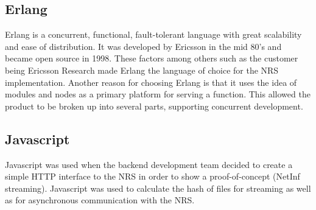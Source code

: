 \subsection{Erlang}
Erlang is a concurrent, functional, fault-tolerant language with great scalability and ease of distribution. It was developed by Ericsson in the mid 80's and became open source in 1998.\cite{otpInAction} These factors among others such as the customer being Ericsson Research made Erlang the language of choice for the NRS implementation.
Another reason for choosing Erlang is that it uses the idea of modules and nodes as a primary platform for serving a function. This allowed the product to be broken up into several parts, supporting concurrent development.
\subsection{Javascript}
Javascript \cite{javascript} was used when the backend development team decided to create a simple HTTP interface to the NRS in order to show a proof-of-concept (NetInf streaming). Javascript was used to calculate the hash of files for streaming as well as for asynchronous communication with the NRS.

